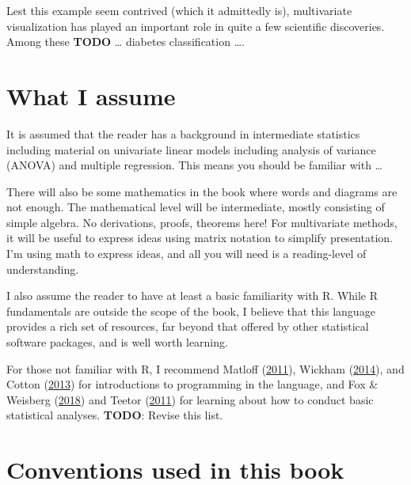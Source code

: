 \documentclass[
  letterpaper,
  10pt,
  krantz2]{krantz}
\begin{document}
Lest this example seem contrived (which it admittedly is), multivariate
visualization has played an important role in quite a few scientific
discoveries. Among these \textbf{TODO} \ldots{} diabetes classification
\ldots.

\hypertarget{what-i-assume}{%
\section*{What I assume}\label{what-i-assume}}


It is assumed that the reader has a background in intermediate
statistics including material on univariate linear models including
analysis of variance (ANOVA) and multiple regression. This means you
should be familiar with \ldots{}

There will also be some mathematics in the book where words and diagrams
are not enough. The mathematical level will be intermediate, mostly
consisting of simple algebra. No derivations, proofs, theorems here! For
multivariate methods, it will be useful to express ideas using matrix
notation to simplify presentation. I'm using math to express ideas, and
all you will need is a reading-level of understanding.

I also assume the reader to have at least a basic familiarity with R.
While R fundamentals are outside the scope of the book, I believe that
this language provides a rich set of resources, far beyond that offered
by other statistical software packages, and is well worth learning.

For those not familiar with R, I recommend Matloff
(\protect\hyperlink{ref-Matloff-2011}{2011}), Wickham
(\protect\hyperlink{ref-Wickham2014}{2014}), and Cotton
(\protect\hyperlink{ref-Cotton-2013}{2013}) for introductions to
programming in the language, and Fox \& Weisberg
(\protect\hyperlink{ref-FoxWeisberg:2018}{2018}) and Teetor
(\protect\hyperlink{ref-Teetor2011}{2011}) for learning about how to
conduct basic statistical analyses. \textbf{TODO}: Revise this list.

\hypertarget{conventions-used-in-this-book}{%
\section*{Conventions used in this
book}\label{conventions-used-in-this-book}}
\end{document}
